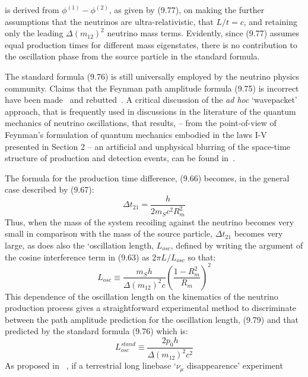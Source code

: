 \documentclass [12pt]{article}
\begin{document}
{   is derived from $ \phi^{(1)}-  \phi^{(2)}$, 
  as given by (9.77), on making the further assumptions that the neutrinos are ultra-relativistic,
   that $L/t = c$, and retaining only the leading $\Delta(m_{12})^2$ neutrino mass terms.
   Evidently, since (9.77) assumes equal production times for different mass eigenstates,
   there is no contribution to the 
   oscillation phase from the source particle in the standard formula. 
   \par The standard formula (9.76) is still universally employed by the neutrino physics
   community. Claims that the Feynman path amplitude formula (9.75) is incorrect 
   have been made~\cite{Giunti} and rebutted~\cite{JHF1,JHF4}. A critical discussion of the
  {\it ad hoc} `wavepacket' approach, that is frequently used in discussions in the
  literature of the quantum mechanics of neutrino oscillations, that results,
   -- from the point-of-view of Feynman's formulation of quantum mechanics embodied
   in the laws I-V presented in Section 2 -- an
   artificial and unphysical
  blurring of the space-time structure of production and detection events, can be found in~\cite{JHF1,JHF2}.
   \par The formula for the production time difference, (9.66) becomes, in the general case
   described by (9.67):
    \begin{equation}
    \Delta t_{21} = \frac{h}{2m_S c^2 R_m^2}
   \end{equation} 
   Thus, when the mass of the system recoiling against the neutrino becomes very small in comparison
   with the mass of the source particle, $ \Delta t_{21}$ becomes very large, as does also
   the `oscillation length, $L_{osc}$, defined by writing the argument of the cosine
   interference term in (9.63) as $2 \pi L/L_{osc}$ so that:
     \begin{equation}
      L_{osc} \equiv \frac{m_S h}{\Delta(m_{12})^2 c} \left(\frac{1-R_m^2}{R_m}\right)^2 
   \end{equation} 
      This dependence of the oscillation length on the kinematics of the neutrino production
   process gives a straightforward  experimental method to discriminate between the path amplitude
   prediction for the oscillation length, (9.79) and that predicted by the standard formula (9.76)
   which is: 
       \begin{equation}
      L_{osc}^{stand} \equiv \frac{ 2 p_0 h}{\Delta(m_{12})^2 c^2}
     \end{equation}   
   As proposed in ~\cite{JHF3}, if a terrestrial long linebase `$\nu_{\mu}$ disappearence' experiment
}
\end{document}
